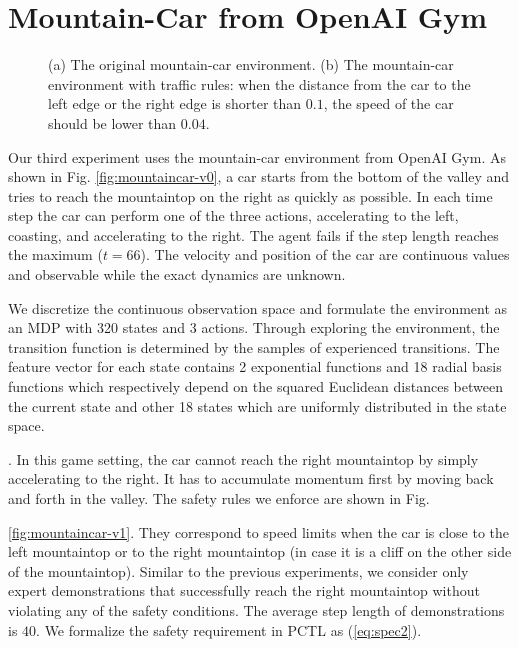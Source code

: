 {\section{Mountain-Car from OpenAI Gym}
\begin{figure}[h]
\centering
{}
\caption[The mountaincar environment]{(a) The original mountain-car environment. (b) The mountain-car environment with traffic rules: when the distance from the car to the left edge or the right edge is shorter than $0.1$, the speed of the car should be lower than $0.04$.}  
\label{fig:mountaincar}
\end{figure}

Our third experiment uses the mountain-car environment from OpenAI Gym. As shown in Fig. {\ref{fig:mountaincar-v0}}, a car starts from the bottom of the valley and tries to reach the mountaintop on the right as quickly as possible. In each time step the car can perform one of the three actions, accelerating to the left, coasting, and accelerating to the right. The agent fails if the step length reaches the maximum ($t=66$). The velocity and position of the car are continuous values and observable while the exact dynamics are unknown.

We discretize the continuous observation space and formulate the environment as an MDP with 320 states and 3 actions. Through exploring the environment, the transition function is determined by the samples of experienced transitions. The feature vector for each state contains 2 exponential functions and 18 radial basis functions which respectively depend on the squared Euclidean distances between the current state and other 18 states which are uniformly distributed in the state space.}. In this game setting, the car cannot reach the right mountaintop by simply accelerating to the right. It has to accumulate momentum first by moving back and forth in the valley. The safety rules we enforce are shown in Fig.~{\ref{fig:mountaincar-v1}. They correspond to speed limits when the car is close to the left mountaintop or to the right mountaintop (in case it is a cliff on the other side of the mountaintop). Similar to the previous experiments, we consider only expert demonstrations that successfully reach the right mountaintop without violating any of the safety conditions. 
The average step length of demonstrations is $40$. 
 We formalize the safety requirement in PCTL as (\ref{eq:spec2}). 

}
